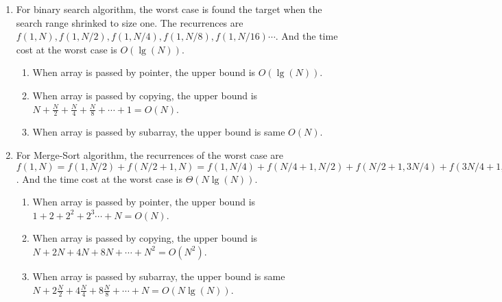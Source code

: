 \documentclass[paper=a4, fontsize=11pt]{scrartcl} %
\numberwithin{equation}{section} %
\numberwithin{figure}{section} %
\numberwithin{table}{section} %
\begin{document}
\begin{enumerate}
\item For binary search algorithm, the worst case is found the
  target when the search range shrinked to size one.
  The recurrences are $f(1,N), f(1,N/2), f(1,N/4), f(1,N/8), f(1,N/16) \cdots$.
  And the time cost at the worst case is $O(\lg(N))$.
  \begin{enumerate}
  \item When array is passed by pointer, the upper bound is $O(\lg(N))$.
  \item When array is passed by copying, the upper bound is
    $N+\frac{N}{2}+\frac{N}{4}+\frac{N}{8}+\cdots+1 = O(N)$.
  \item When array is passed by subarray, the upper bound is same $O(N)$.
  \end{enumerate}
\item For Merge-Sort algorithm, the recurrences of the worst case are
  $f(1,N)=f(1,N/2)+f(N/2+1,N)=f(1,N/4)+f(N/4+1,N/2)+f(N/2+1,3N/4)+f(3N/4+1,N)\cdots$.
  And the time cost at the worst case is $\Theta(N\lg(N))$.
  \begin{enumerate}
  \item When array is passed by pointer, the upper bound is $1+2+2^2+2^3\cdots+N=O(N)$.
  \item When array is passed by copying, the upper bound is
    $N+2N+4N+8N+\cdots+N^2 = O(N^2)$.
  \item When array is passed by subarray, the upper bound is same
    $N+2\frac{N}{2}+4\frac{N}{4}+8\frac{N}{8}+\cdots+N = O(N\lg(N))$.
  \end{enumerate}
\end{enumerate}
\end{document}
